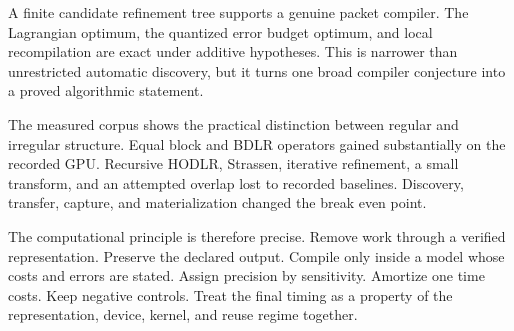 A finite candidate refinement tree supports a genuine packet compiler. The Lagrangian optimum, the quantized error budget optimum, and local recompilation are exact under additive hypotheses. This is narrower than unrestricted automatic discovery, but it turns one broad compiler conjecture into a proved algorithmic statement.

The measured corpus shows the practical distinction between regular and irregular structure. Equal block and BDLR operators gained substantially on the recorded GPU. Recursive HODLR, Strassen, iterative refinement, a small transform, and an attempted overlap lost to recorded baselines. Discovery, transfer, capture, and materialization changed the break even point.

The computational principle is therefore precise. Remove work through a verified representation. Preserve the declared output. Compile only inside a model whose costs and errors are stated. Assign precision by sensitivity. Amortize one time costs. Keep negative controls. Treat the final timing as a property of the representation, device, kernel, and reuse regime together.


